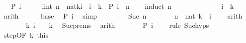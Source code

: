 \begin{isabellebody}
\ \ \ {\isachardoublequoteopen}P\ i{\isachardoublequoteclose}\isanewline
%
\isadelimproof
%
\endisadelimproof
%
\isatagproof
{}\isamarkupfalse%
\ {\isacharminus}{\kern0pt}\isanewline
\ \ \isamarkupfalse%
\ {\isachardoublequoteopen}{\isasymAnd}i{\isacharcolon}{\kern0pt}{\isacharcolon}{\kern0pt}int{\isachardot}{\kern0pt}\ n\ {\isacharequal}{\kern0pt}\ nat{\isacharparenleft}{\kern0pt}k{\isacharminus}{\kern0pt}i{\isacharparenright}{\kern0pt}\ {\isasymLongrightarrow}\ i\ {\isasymle}\ k\ {\isasymLongrightarrow}\ P\ i{\isachardoublequoteclose}\ \ n\isanewline
\ \ \isamarkupfalse%
\ {\isacharparenleft}{\kern0pt}induct\ n{\isacharparenright}{\kern0pt}\isanewline
\ \ \ \ \isamarkupfalse%
\ {}\isanewline
\ \ \ \ \isamarkupfalse%
\ \isamarkupfalse%
\ {\isachardoublequoteopen}i\ {\isacharequal}{\kern0pt}\ k{\isachardoublequoteclose}\ \isamarkupfalse%
\ arith\isanewline
\ \ \ \ \isamarkupfalse%
\ base\ \isamarkupfalse%
\ {\isachardoublequoteopen}P\ i{\isachardoublequoteclose}\ \isamarkupfalse%
\ simp\isanewline
\ \ \isamarkupfalse%
\isanewline
\ \ \ \ \isamarkupfalse%
\ {\isacharparenleft}{\kern0pt}Suc\ n{\isacharparenright}{\kern0pt}\isanewline
\ \ \ \ \isamarkupfalse%
\ \isamarkupfalse%
\ {\isachardoublequoteopen}n\ {\isacharequal}{\kern0pt}\ nat\ {\isacharparenleft}{\kern0pt}k\ {\isacharminus}{\kern0pt}\ {\isacharparenleft}{\kern0pt}i\ {\isacharplus}{\kern0pt}\ {}{\isacharparenright}{\kern0pt}{\isacharparenright}{\kern0pt}{\isachardoublequoteclose}\ \isamarkupfalse%
\ arith\isanewline
\ \ \ \ \isamarkupfalse%
\ \isamarkupfalse%
\ k{\isacharcolon}{\kern0pt}\ {\isachardoublequoteopen}i\ {\isacharplus}{\kern0pt}\ {}\ {\isasymle}\ k{\isachardoublequoteclose}\ \isamarkupfalse%
\ Suc{\isachardot}{\kern0pt}prems\ \isamarkupfalse%
\ arith\isanewline
\ \ \ \ \isamarkupfalse%
\ \isamarkupfalse%
\ {\isachardoublequoteopen}P\ {\isacharparenleft}{\kern0pt}i\ {\isacharplus}{\kern0pt}\ {}{\isacharparenright}{\kern0pt}{\isachardoublequoteclose}\ \isamarkupfalse%
\ {\isacharparenleft}{\kern0pt}rule\ Suc{\isachardot}{\kern0pt}hyps{\isacharparenright}{\kern0pt}\isanewline
\ \ \ \ \isamarkupfalse%
\ step{\isacharbrackleft}{\kern0pt}OF\ k\ this{\isacharbrackright}{\kern0pt}\ \isamarkupfalse%

\end{isabellebody}
